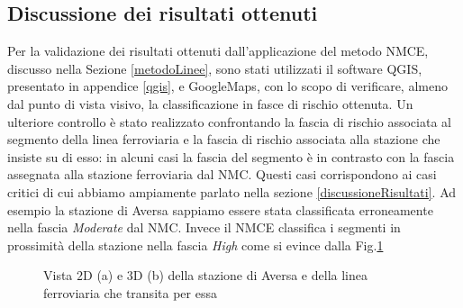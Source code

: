 \subsection{Discussione dei risultati ottenuti}
\label{discussioneLinee}
Per la validazione dei risultati ottenuti dall'applicazione del metodo NMCE, discusso nella Sezione \ref{metodoLinee}, sono stati utilizzati il software QGIS, presentato in appendice \ref{qgis}, e GoogleMaps, con lo scopo di verificare, almeno dal punto di vista visivo, la classificazione in fasce di rischio ottenuta. 
 Un ulteriore controllo è stato realizzato confrontando la fascia di rischio associata al segmento della linea ferroviaria e la fascia di rischio associata alla stazione che insiste su di esso: in alcuni casi la fascia del segmento è in contrasto con la fascia assegnata alla stazione ferroviaria dal NMC. Questi casi corrispondono ai casi critici di cui abbiamo ampiamente parlato nella sezione \ref{discussioneRisultati}. Ad esempio la stazione di Aversa sappiamo essere stata classificata erroneamente nella fascia \textit{Moderate} dal NMC. Invece il NMCE classifica i segmenti in prossimità della stazione nella fascia \textit{High} come si evince dalla Fig.\ref{aversalinea}
\begin{figure}[bth]
\myfloatalign
{} \quad
{} 
\caption{Vista $2$D (a) e $3$D (b) della stazione di Aversa e della linea ferroviaria che  transita per essa }\label{aversalinea}
\end{figure}
\newline
